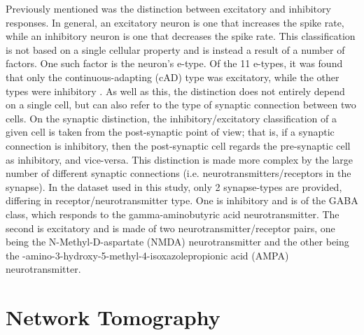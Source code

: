 \par
Previously mentioned was the distinction between excitatory and inhibitory responses. In general, an excitatory neuron is one that increases the spike rate, while an inhibitory neuron is one that decreases the spike rate. This classification is not based on a single cellular property and is instead a result of a number of factors. One such factor is the neuron's e-type. Of the 11 e-types, it was found that only the continuous-adapting (cAD) type was excitatory, while the other types were inhibitory \cite{reconSim}. As well as this, the distinction does not entirely depend on a single cell, but can also refer to the type of synaptic connection between two cells. On the synaptic distinction, the inhibitory/excitatory classification of a given cell is taken from the post-synaptic point of view; that is, if a synaptic connection is inhibitory, then the post-synaptic cell regards the pre-synaptic cell as inhibitory, and vice-versa. This distinction is made more complex by the large number of different synaptic connections (i.e. neurotransmitters/receptors in the synapse). In the dataset used in this study, only 2 synapse-types are provided, differing in receptor/neurotransmitter type. One is inhibitory and is of the GABA class, which responds to the gamma-aminobutyric acid neurotransmitter. The second is excitatory and is made of two neurotransmitter/receptor pairs, one being the N-Methyl-D-aspartate (NMDA) neurotransmitter and the other being the \textalpha-amino-3-hydroxy-5-methyl-4-isoxazolepropionic acid (AMPA) neurotransmitter. \\

\section{Network Tomography}

